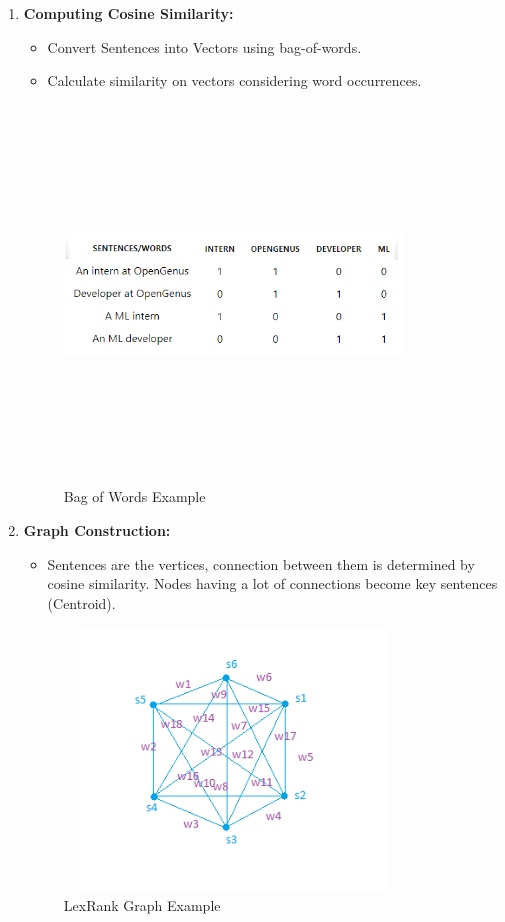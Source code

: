 \documentclass{ieeeaccess}
\begin{document}
\begin{enumerate}
    \item \textbf{Computing Cosine Similarity:}
    \begin{itemize}
        \item Convert Sentences into Vectors using bag-of-words.
        \item Calculate similarity on vectors considering word occurrences.
    \end{itemize}

    \begin{figure}	[!htb]
    \centering
    \includegraphics[width=9cm, height=10cm, keepaspectratio]{bagofwords.png}
    \caption{Bag of Words Example}
    \label{bag_of_words}
    \end{figure} 
    
    \item \textbf{Graph Construction:}
    \begin{itemize}
        \item Sentences are the vertices, connection between them is determined by cosine similarity. Nodes having a lot of connections become key sentences (Centroid).
    \end{itemize}

    \begin{figure}	[!htb]
    \centering
    \includegraphics[width=9cm, height=7cm, keepaspectratio]{Lex.png}
    \caption{LexRank Graph Example}
    \label{lexrank_graph}
    \end{figure} 
    

\end{enumerate}
\end{document}
